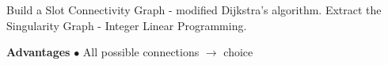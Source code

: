 \documentclass[a0paper,portrait, fontscale=0.30]{baposter}
\begin{document}
\begin{poster}
{%
%
% 
% 
\begin{tcolorbox}[colframe=gray,boxrule=0.01pt,left=0mm,right=0mm,title=\Large Discrete Strategy]
Build a Slot Connectivity Graph - modified Dijkstra's algorithm.
\newline
Extract the Singularity Graph - Integer Linear Programming.%
\vspace{0.1cm}
\newline
\vspace{0.02cm}
\begin{minipage}[t]{0.5\linewidth}%
\textbf{Advantages}
\newline
\noindent
$\bullet$ All possible connections $\rightarrow$ choice
\newline

\end{minipage}
\end{tcolorbox}}
\end{poster}
\end{document}
